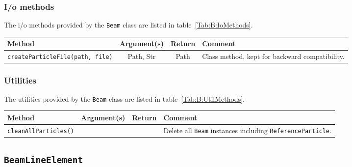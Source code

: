 \subsubsection{I/o methods}
The i/o methods provided by the \texttt{Beam} class are listed in
table~\ref{Tab:B:IoMethods}.
\begin{sidewaystable}[h]
  \caption{
    I/o methods provided by the \texttt{Beam} class. 
  }
  \label{Tab:B:IoMethods}
  \begin{center}
    \begin{tabular}{|l|c|c|p{10cm}|}
      \hline
      \textbf{Method} & \textbf{Argument(s)} & \textbf{Return} & \textbf{Comment}                                          \\
      \hline
      \texttt{createParticleFile(path, file)} & Path, Str & Path    & Class method, kept for backward compatibility.          \\
      \hline
    \end{tabular}
  \end{center}
\end{sidewaystable}


\subsubsection{Utilities}
The utilities provided by the \texttt{Beam} class are listed in
table~\ref{Tab:B:UtilMethods}.
\begin{sidewaystable}[h]
  \caption{
    Utilities provided by the \texttt{Beam}
    class. 
  }
  \label{Tab:B:UtilMethods}
  \begin{center}
    \begin{tabular}{|l|c|c|p{10cm}|}
      \hline
      \textbf{Method} & \textbf{Argument(s)} & \textbf{Return} & \textbf{Comment}                                          \\
      \hline
      \texttt{cleanAllParticles()}&  &  & Delete all \texttt{Beam} instances including \texttt{ReferenceParticle}.     \\
      \hline
    \end{tabular}
  \end{center}
\end{sidewaystable}

\FloatBarrier

\subsection{\texttt{BeamLineElement}}
\label{SubSubSect:BLE}

